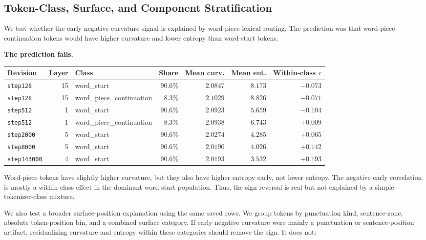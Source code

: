 \documentclass[11pt,letterpaper]{article}
\begin{document}
\subsection{Token-Class, Surface, and Component Stratification}
\label{sec:exp-strat}

We test whether the early negative curvature signal is explained by
word-piece lexical routing. The prediction was that
word-piece-continuation tokens would have higher curvature and lower
entropy than word-start tokens.

\textbf{The prediction fails.}

\begin{center}
\small
\begin{tabular}{lrlrrrr}
\toprule
\textbf{Revision} & \textbf{Layer} & \textbf{Class} & \textbf{Share} & \textbf{Mean curv.} & \textbf{Mean ent.} & \textbf{Within-class $r$} \\
\midrule
\texttt{step128}    & 15 & word\_start              & $90.6\%$ & $2.0847$ & $8.173$ & $-0.073$ \\
\texttt{step128}    & 15 & word\_piece\_continuation & $8.3\%$  & $2.1029$ & $8.826$ & $-0.071$ \\
\texttt{step512}    &  1 & word\_start              & $90.6\%$ & $2.0923$ & $5.659$ & $-0.104$ \\
\texttt{step512}    &  1 & word\_piece\_continuation & $8.3\%$  & $2.0938$ & $6.743$ & $+0.009$ \\
\texttt{step2000}   &  5 & word\_start              & $90.6\%$ & $2.0274$ & $4.285$ & $+0.065$ \\
\texttt{step8000}   &  5 & word\_start              & $90.6\%$ & $2.0190$ & $4.026$ & $+0.142$ \\
\texttt{step143000} &  4 & word\_start              & $90.6\%$ & $2.0193$ & $3.532$ & $+0.193$ \\
\bottomrule
\end{tabular}
\end{center}

Word-piece tokens have slightly higher curvature, but they also have
higher entropy early, not lower entropy. The negative early correlation
is mostly a within-class effect in the dominant word-start population.
Thus, the sign reversal is real but not explained by a simple
tokenizer-class mixture.

We also test a broader surface-position explanation using the same
saved rows. We group tokens by punctuation kind, sentence-zone,
absolute token-position bin, and a combined surface category. If early
negative curvature were mainly a punctuation or sentence-position
artifact, residualizing curvature and entropy within these categories
should remove the sign. It does not:
\end{document}
